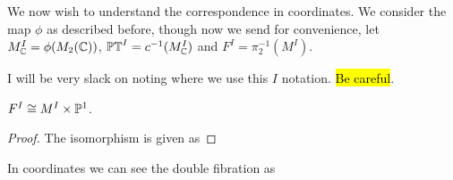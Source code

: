 \documentclass{article}
\begin{document}
We now wish to understand the correspondence in coordinates. We consider the map $\phi$ as described before, though now we send 
for convenience, let $M^I_{\mathbb{C}}= \phi(M_2(\mathbb{C}))$, $\mathbb{PT}^I = c^{-1}(M_{\mathbb{C}}^I)$ and $F^I = \pi_2^{-1}(M^I)$.
\begin{remark}
I will be very slack on noting where we use this $I$ notation. \hl{Be careful}. 	
\end{remark}

\begin{prop}
	$F^I \cong M^I \times \mathbb{P}^1$. 
\end{prop} 
\begin{proof}
	The isomorphism is given as 
\end{proof}
\begin{corollary}
	In coordinates we can see the double fibration as 
\end{corollary}
\end{document}
